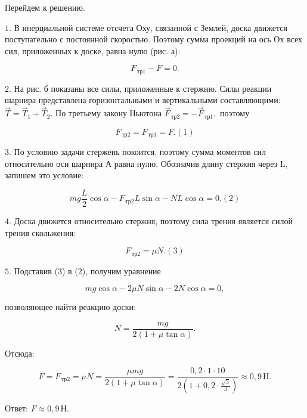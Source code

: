 \documentclass[12pt,a4paper]{article}
\begin{document}
{Перейдем к решению.\begin{center}\end{center} 
$1$.  В инерциальной системе отсчета Оху, связанной с Землей, доска движется поступательно с постоянной скоростью. Поэтому сумма проекций на ось Ох всех сил, приложенных к доске, равна нулю (рис. а):

\[F_{\,\text{тр}1} - F = 0.\]

$2$.  На рис. б показаны все силы, приложенные к стержню. Силы реакции шарнира представлена горизонтальными и вертикальными составляющими: $\vec T = \vec T_1 + \vec T_2.$ По третьему закону Ньютона $\vec F_{\,\text{тр}2} = - \vec F_{\,\text{тр}1},$ поэтому

\[F_{\,\text{тр}2} = F_{\,\text{тр}1} = F. ( 1 )\]

$3$.  По условию задачи стержень покоится, поэтому сумма моментов сил относительно оси шарнира А равна нулю. Обозначив длину стержня через L, запишем это условие:\begin{center}\end{center}

\[mg \frac{L}{2} \cos \alpha - F_{\,\text{тр}2}L \sin \alpha - NL \cos \alpha = 0. ( 2 )\]

$4$.  Доска движется относительно стержня, поэтому сила трения является силой трения скольжения:

\[F_{\,\text{тр}2} = \mu N. ( 3 )\]

$5$.  Подставив ($3$) в ($2$), получим уравнение

\[mg \cos \alpha - 2\mu N \sin \alpha - 2N \cos \alpha = 0,\]

позволяющее найти реакцию доски:

\[N= \frac{mg}{2 ( 1 + \mu \tan \alpha )} .\]

 Отсюда:

\[F=F_{\,\text{тр}2} = \mu N = \frac{\mu mg}{2 ( 1 + \mu \tan \alpha )} = \frac{0{,}2 \cdot 1 \cdot 10}{2 ( 1 + 0{,}2 \cdot \frac{\sqrt{3}}{3} )} \approx 0{,}9\,\text{Н}.\]

Ответ: $F \approx 0{,}9\,\text{Н}.$
}
\end{document}
